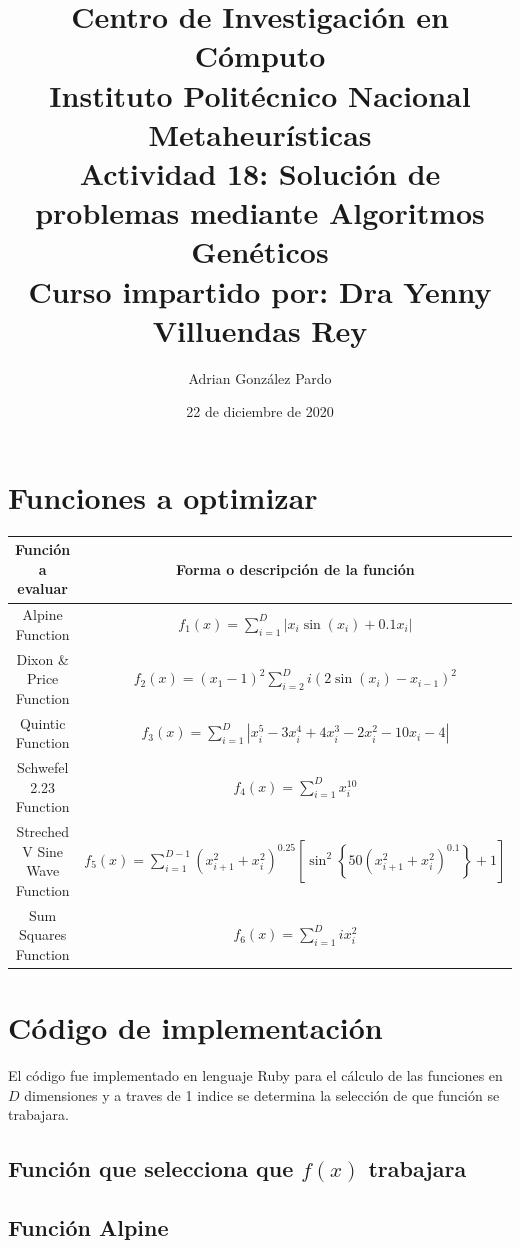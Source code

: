 \documentclass[10pt]{article}
\title{Centro de Investigación en Cómputo\\Instituto Politécnico Nacional\\Metaheurísticas\\Actividad 18: Solución de problemas mediante Algoritmos Genéticos\\Curso impartido por: Dra Yenny Villuendas Rey}
\author{Adrian González Pardo}
\date{22 de diciembre de 2020}
\begin{document}
\maketitle
\section{Funciones a optimizar}
\begin{center}
  \begin{tabular}{|c|c|}
    \hline
    Función a evaluar & Forma o descripción de la función\\
    \hline
    Alpine Function & \(\displaystyle f_{1}(x)=\sum_{i=1}^{D} \left|x_{i}\sin(x_{i})+0.1x_{i}\right|\) \\
    \hline
    Dixon \& Price Function & \(\displaystyle f_{2}(x)=(x_{1}-1)^{2}\sum_{i=2}^{D} i\left(2\sin(x_{i})-x_{i-1}\right)^{2}\)\\
    \hline
    Quintic Function & \(\displaystyle f_{3}(x)=\sum_{i=1}^{D} \left|x_{i}^{5}-3x_{i}^{4}+4x_{i}^3-2x_{i}^{2}-10x_{i}-4\right|\)\\
    \hline
    Schwefel 2.23 Function & \(\displaystyle f_{4}(x)=\sum_{i=1}^{D}x_{i}^{10}\)\\
    \hline
    Streched V Sine Wave Function & \(\displaystyle f_{5}(x)=\sum_{i=1}^{D-1}(x_{i+1}^{2}+x_{i}^{2})^{0.25}\left[\sin^{2}\left\{50(x_{i+1}^{2}+x_{i}^{2})^{0.1}\right\}+1\right]\)\\
    \hline
    Sum Squares Function & \(\displaystyle f_{6}(x)=\sum_{i=1}^{D}ix_{i}^{2}\)\\
    \hline
  \end{tabular}
\end{center}
\clearpage
\section{Código de implementación}
El código fue implementado en lenguaje Ruby para el cálculo de las funciones en $D$ dimensiones y a traves de 1 indice se determina la selección de que función se trabajara.
\subsection{Función que selecciona que $f(x)$ trabajara}
\begin{center}
  
\end{center}
\subsection{Función Alpine}
\begin{center}
  
\end{center}
\end{document}
